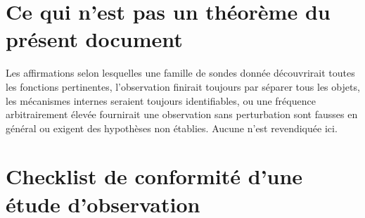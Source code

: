 \documentclass[11pt,oneside]{book}
\theoremstyle{definition}
\theoremstyle{remark}
\newcommand{\1}{\mathbf 1}
\begin{document}
\section{Ce qui n'est pas un théorème du présent document}
Les affirmations selon lesquelles une famille de sondes donnée découvrirait toutes les fonctions pertinentes, l'observation finirait toujours par séparer tous les objets, les mécanismes internes seraient toujours identifiables, ou une fréquence arbitrairement élevée fournirait une observation sans perturbation sont fausses en général ou exigent des hypothèses non établies. Aucune n'est revendiquée ici.

\section*{Checklist de conformité d'une étude d'observation}
\end{document}
